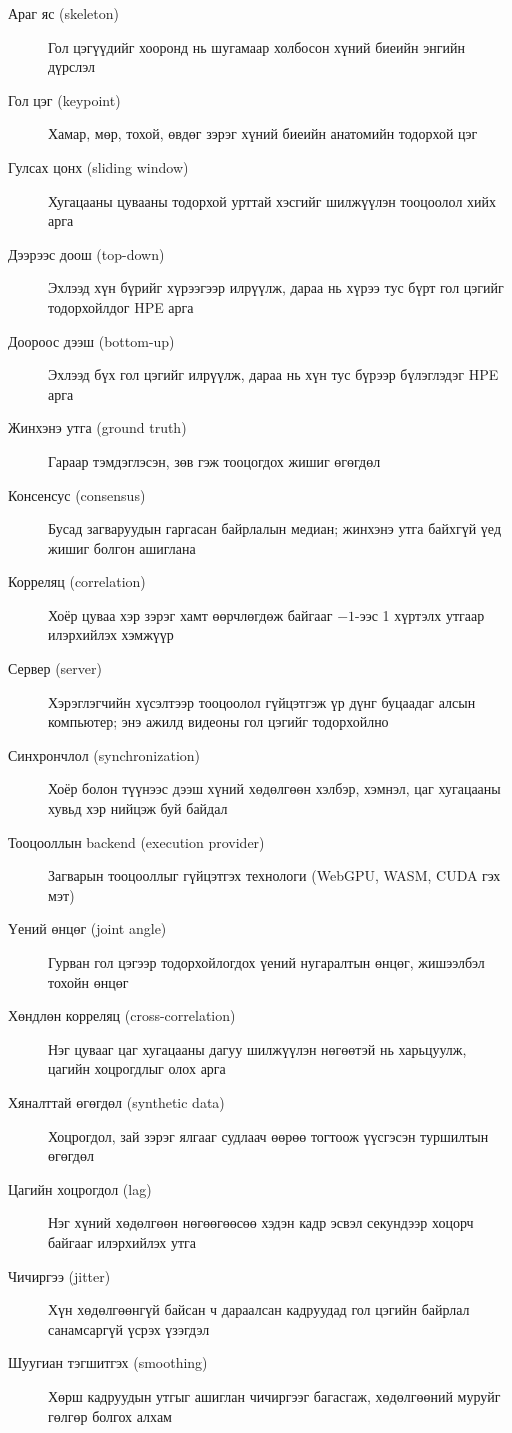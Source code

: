 \begin{description}
\item[Араг яс (skeleton)] Гол цэгүүдийг хооронд нь шугамаар холбосон хүний биеийн энгийн дүрслэл
\item[Гол цэг (keypoint)] Хамар, мөр, тохой, өвдөг зэрэг хүний биеийн анатомийн тодорхой цэг
\item[Гулсах цонх (sliding window)] Хугацааны цувааны тодорхой урттай хэсгийг шилжүүлэн тооцоолол хийх арга
\item[Дээрээс доош (top-down)] Эхлээд хүн бүрийг хүрээгээр илрүүлж, дараа нь хүрээ тус бүрт гол цэгийг тодорхойлдог HPE арга
\item[Доороос дээш (bottom-up)] Эхлээд бүх гол цэгийг илрүүлж, дараа нь хүн тус бүрээр бүлэглэдэг HPE арга
\item[Жинхэнэ утга (ground truth)] Гараар тэмдэглэсэн, зөв гэж тооцогдох жишиг өгөгдөл
\item[Консенсус (consensus)] Бусад загваруудын гаргасан байрлалын медиан; жинхэнэ утга байхгүй үед жишиг болгон ашиглана
\item[Корреляц (correlation)] Хоёр цуваа хэр зэрэг хамт өөрчлөгдөж байгааг $-1$-ээс 1 хүртэлх утгаар илэрхийлэх хэмжүүр
\item[Сервер (server)] Хэрэглэгчийн хүсэлтээр тооцоолол гүйцэтгэж үр дүнг буцаадаг алсын компьютер; энэ ажилд видеоны гол цэгийг тодорхойлно
\item[Синхрончлол (synchronization)] Хоёр болон түүнээс дээш хүний хөдөлгөөн хэлбэр, хэмнэл, цаг хугацааны хувьд хэр нийцэж буй байдал
\item[Тооцооллын backend (execution provider)] Загварын тооцооллыг гүйцэтгэх технологи (WebGPU, WASM, CUDA гэх мэт)
\item[Үений өнцөг (joint angle)] Гурван гол цэгээр тодорхойлогдох үений нугаралтын өнцөг, жишээлбэл тохойн өнцөг
\item[Хөндлөн корреляц (cross-correlation)] Нэг цувааг цаг хугацааны дагуу шилжүүлэн нөгөөтэй нь харьцуулж, цагийн хоцрогдлыг олох арга
\item[Хяналттай өгөгдөл (synthetic data)] Хоцрогдол, зай зэрэг ялгааг судлаач өөрөө тогтоож үүсгэсэн туршилтын өгөгдөл
\item[Цагийн хоцрогдол (lag)] Нэг хүний хөдөлгөөн нөгөөгөөсөө хэдэн кадр эсвэл секундээр хоцорч байгааг илэрхийлэх утга
\item[Чичиргээ (jitter)] Хүн хөдөлгөөнгүй байсан ч дараалсан кадруудад гол цэгийн байрлал санамсаргүй үсрэх үзэгдэл
\item[Шуугиан тэгшитгэх (smoothing)] Хөрш кадруудын утгыг ашиглан чичиргээг багасгаж, хөдөлгөөний муруйг гөлгөр болгох алхам
\end{description}

\doublespace
\newpage
\endgroup
